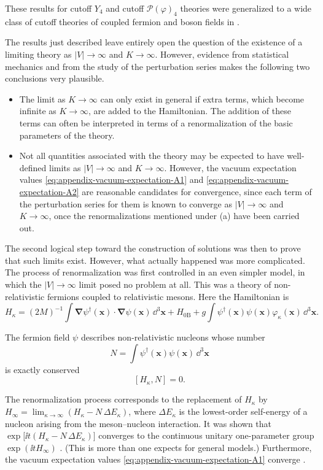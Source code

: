 These results for cutoff $Y_4$ and cutoff $\mathcal{P}(\varphi)_4$ theories
were generalized to a wide class of cutoff theories of coupled fermion and
boson fields in \cite{pct-app-12}.

The results just described leave entirely open the question of the existence
of a limiting theory as $|V|\to\infty$ and $K\to\infty$. However, evidence
from statistical mechanics and from the study of the perturbation series makes
the following two conclusions very plausible.

\begin{itemize}
\item[(a)] The limit as $K\to\infty$ can only exist in general if extra terms,
  which become infinite as $K\to\infty$, are added to the Hamiltonian. The
  addition of these terms can often be interpreted in terms of a
  renormalization of the basic parameters of the theory.
\item[(b)] Not all quantities associated with the theory may be expected to
  have well-defined limits as $|V|\to\infty$ and $K\to\infty$. However, the
  vacuum expectation values \eqref{eq:appendix-vacuum-expectation-A1} and \eqref{eq:appendix-vacuum-expectation-A2} are reasonable candidates for
  convergence, since each term of the perturbation series for them is known to
  converge as $|V|\to\infty$ and $K\to\infty$, once the renormalizations
  mentioned under (a) have been carried out.
\end{itemize}

The second logical step toward the construction of solutions was then to prove
that such limits exist. However, what actually happened was more complicated.
The process of renormalization was first controlled in an even simpler model,
in which the $|V|\to\infty$ limit posed no problem at all. This was a theory of
non-relativistic fermions coupled to relativistic mesons. Here the Hamiltonian
is
\[
  H_\kappa=(2M)^{-1}\int
    \boldsymbol{\nabla}\psi^\dagger(\mathbf{x})\!\cdot\!
    \boldsymbol{\nabla}\psi(\mathbf{x})\,\dd^3\mathbf{x}
    +H_{0\mathrm B}
    +g\int\psi^\dagger(\mathbf{x})\psi(\mathbf{x})
      \varphi_\kappa(\mathbf{x})\,\dd^3\mathbf{x}.
\]

The fermion field $\psi$ describes non-relativistic nucleons whose number
\[
  N=\int\psi^\dagger(\mathbf{x})\psi(\mathbf{x})\,\dd^3\mathbf{x}
\]
is exactly conserved
\[
  [H_\kappa,N]=0.
\]

The renormalization process corresponds to the replacement of $H_\kappa$ by
$H_\infty=\lim_{\kappa\to\infty}(H_\kappa-N\,\Delta E_\kappa)$,
where $\Delta E_\kappa$ is the lowest-order self-energy of a nucleon arising
from the meson--nucleon interaction. It was shown that
$\exp\!\bigl[\ii t(H_\kappa-N\,\Delta E_\kappa)\bigr]$
converges to the continuous unitary one-parameter group
$\exp(\ii tH_\infty)$ \cite{pct-app-13}. (This is more than one expects for general models.)
Furthermore, the vacuum expectation values \eqref{eq:appendix-vacuum-expectation-A1} converge \cite{pct-app-14}.

